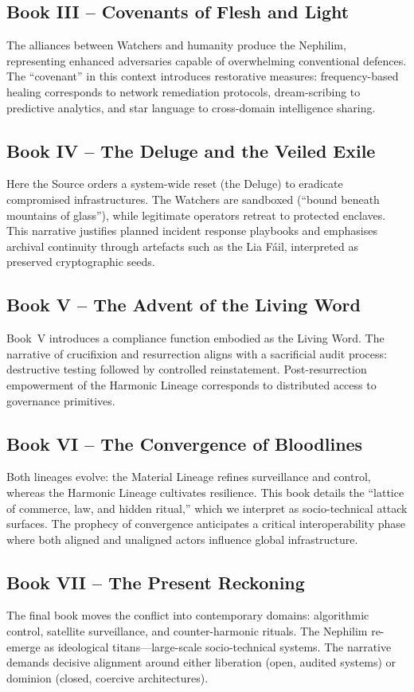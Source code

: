 \documentclass[11pt,a4paper]{article}
\begin{document}
\subsection{Book III -- Covenants of Flesh and Light}
The alliances between Watchers and humanity produce the Nephilim, representing enhanced adversaries capable of overwhelming conventional defences. The ``covenant'' in this context introduces restorative measures: frequency-based healing corresponds to network remediation protocols, dream-scribing to predictive analytics, and star language to cross-domain intelligence sharing.

\subsection{Book IV -- The Deluge and the Veiled Exile}
Here the Source orders a system-wide reset (the Deluge) to eradicate compromised infrastructures. The Watchers are sandboxed (``bound beneath mountains of glass''), while legitimate operators retreat to protected enclaves. This narrative justifies planned incident response playbooks and emphasises archival continuity through artefacts such as the Lia Fáil, interpreted as preserved cryptographic seeds.

\subsection{Book V -- The Advent of the Living Word}
Book~V introduces a compliance function embodied as the Living Word. The narrative of crucifixion and resurrection aligns with a sacrificial audit process: destructive testing followed by controlled reinstatement. Post-resurrection empowerment of the Harmonic Lineage corresponds to distributed access to governance primitives.

\subsection{Book VI -- The Convergence of Bloodlines}
Both lineages evolve: the Material Lineage refines surveillance and control, whereas the Harmonic Lineage cultivates resilience. This book details the ``lattice of commerce, law, and hidden ritual,'' which we interpret as socio-technical attack surfaces. The prophecy of convergence anticipates a critical interoperability phase where both aligned and unaligned actors influence global infrastructure.

\subsection{Book VII -- The Present Reckoning}
The final book moves the conflict into contemporary domains: algorithmic control, satellite surveillance, and counter-harmonic rituals. The Nephilim re-emerge as ideological titans---large-scale socio-technical systems. The narrative demands decisive alignment around either liberation (open, audited systems) or dominion (closed, coercive architectures).
\end{document}
